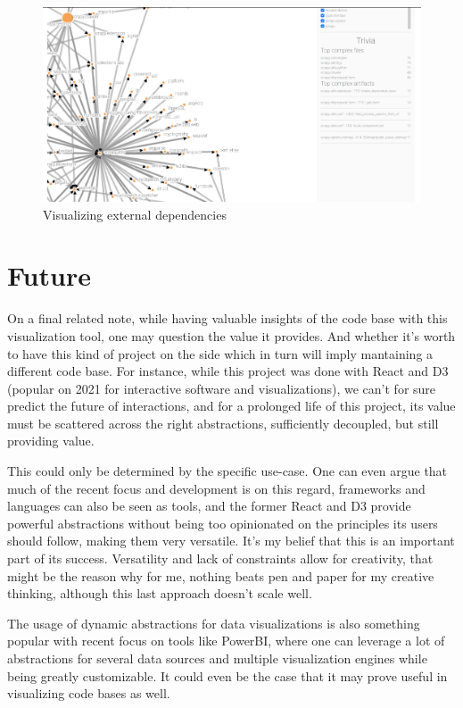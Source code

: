 \documentclass[a4paper,11pt]{article}
\begin{document}
\begin{figure}
\includegraphics[width=.9\linewidth]{../screenshots/external_deps.png}
\caption{Visualizing external dependencies}
\label{deps}
\end{figure}

\section{Future}
\label{sec:orgcad505c}

On a final related note, while having valuable insights of the code base with this visualization tool, one may question the value it provides. And whether it's worth to have this kind of project on the side which in turn will imply mantaining a different code base. For instance, while this project was done with React and D3 (popular on 2021 for interactive software and visualizations), we can't for sure predict the future of interactions, and for a prolonged life of this project, its value must be scattered across the right abstractions, sufficiently decoupled, but still providing value.

This could only be determined by the specific use-case. One can even argue that much of the recent focus and development is on this regard, frameworks and languages can also be seen as tools, and the former React and D3 provide powerful abstractions without being too opinionated on the principles its users should follow, making them very versatile. It's my belief that this is an important part of its success. Versatility and lack of constraints allow for creativity, that might be the reason why for me, nothing beats pen and paper for my creative thinking, although this last approach doesn't scale well.

The usage of dynamic abstractions for data visualizations is also something popular with recent focus on tools like PowerBI, where one can leverage a lot of abstractions for several data sources and multiple visualization engines while being greatly customizable. It could even be the case that it may prove useful in visualizing code bases as well.
\end{document}

